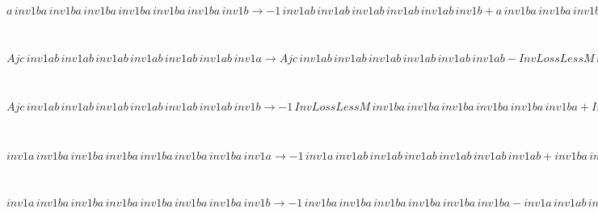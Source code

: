 \begin{minipage}{6in}
$
a\,
 inv1ba\,
 inv1ba\,
 inv1ba\,
 inv1ba\,
 inv1ba\,
 inv1ba\,
 inv1b\rightarrow -1\,
 inv1ab\,
 inv1ab\,
 inv1ab\,
 inv1ab\,
 inv1ab\,
 inv1b + a\,
 inv1ba\,
 inv1ba\,
 inv1ba\,
 inv1ba\,
 inv1ba\,
 inv1ba + inv1ab\,
 inv1ab\,
 inv1ab\,
 inv1ab\,
 inv1ab\,
 inv1ab\,
 inv1b
$
\end{minipage}\medskip \\
\begin{minipage}{6in}
$
Ajc\,
 inv1ab\,
 inv1ab\,
 inv1ab\,
 inv1ab\,
 inv1ab\,
 inv1ab\,
 inv1a\rightarrow Ajc\,
 inv1ab\,
 inv1ab\,
 inv1ab\,
 inv1ab\,
 inv1ab\,
 inv1ab - InvLossLessM\,
 inv1ba\,
 inv1ba\,
 inv1ba\,
 inv1ba\,
 inv1ba\,
 inv1a + InvLossLessM\,
 inv1ba\,
 inv1ba\,
 inv1ba\,
 inv1ba\,
 inv1ba\,
 inv1ba\,
 inv1a
$
\end{minipage}\medskip \\
\begin{minipage}{6in}
$
Ajc\,
 inv1ab\,
 inv1ab\,
 inv1ab\,
 inv1ab\,
 inv1ab\,
 inv1ab\,
 inv1b\rightarrow -1\,
 InvLossLessM\,
 inv1ba\,
 inv1ba\,
 inv1ba\,
 inv1ba\,
 inv1ba\,
 inv1ba + InvLossLessM\,
 inv1ba\,
 inv1ba\,
 inv1ba\,
 inv1ba\,
 inv1ba\,
 inv1ba\,
 inv1b
$
\end{minipage}\medskip \\
\begin{minipage}{6in}
$
inv1a\,
 inv1ba\,
 inv1ba\,
 inv1ba\,
 inv1ba\,
 inv1ba\,
 inv1ba\,
 inv1a\rightarrow -1\,
 inv1a\,
 inv1ab\,
 inv1ab\,
 inv1ab\,
 inv1ab\,
 inv1ab\,
 inv1ab + inv1ba\,
 inv1ba\,
 inv1ba\,
 inv1ba\,
 inv1ba\,
 inv1ba\,
 inv1a + inv1a\,
 inv1ab\,
 inv1ab\,
 inv1ab\,
 inv1ab\,
 inv1ab\,
 inv1ab\,
 inv1a
$
\end{minipage}\medskip \\
\begin{minipage}{6in}
$
inv1a\,
 inv1ba\,
 inv1ba\,
 inv1ba\,
 inv1ba\,
 inv1ba\,
 inv1ba\,
 inv1b\rightarrow -1\,
 inv1ba\,
 inv1ba\,
 inv1ba\,
 inv1ba\,
 inv1ba\,
 inv1ba - inv1a\,
 inv1ab\,
 inv1ab\,
 inv1ab\,
 inv1ab\,
 inv1ab\,
 inv1b + inv1a\,
 inv1ba\,
 inv1ba\,
 inv1ba\,
 inv1ba\,
 inv1ba\,
 inv1ba + inv1ba\,
 inv1ba\,
 inv1ba\,
 inv1ba\,
 inv1ba\,
 inv1ba\,
 inv1b + inv1a\,
 inv1ab\,
 inv1ab\,
 inv1ab\,
 inv1ab\,
 inv1ab\,
 inv1ab\,
 inv1b
$
\end{minipage}\medskip \\
